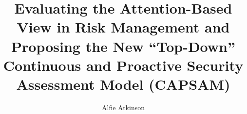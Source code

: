 \author{Alfie Atkinson}

\title{\bfseries\Large Evaluating the Attention-Based View in Risk Management and Proposing the New ``Top-Down'' Continuous and Proactive Security Assessment Model (CAPSAM)}


